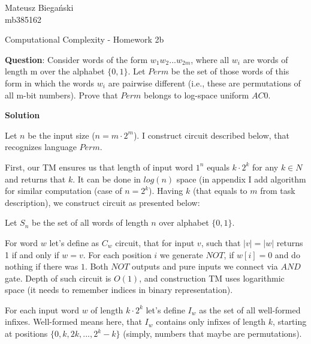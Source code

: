 \documentclass[12pt]{article}
\begin{document}

\begin{flushright}
    Mateusz Biegański \\ 
    mb385162
\end{flushright}

\begin{center}
    \Large Computational Complexity - Homework 2b \normalsize
\end{center}

\textbf{Question}:
Consider words of the form $w_1w_2 ...w_{2m}$, where all $w_i$ are words of
length m over the alphabet $\{0, 1\}$. Let $Perm$ be the set of those words of this form in which the
words $w_i$ are pairwise different (i.e., these are permutations of all m-bit numbers). Prove that
$Perm$ belongs to log-space uniform $AC0$.



{\bf Solution}

Let $n$ be the input size ($n = m \cdot 2^m$). I construct circuit described below, that recognizes language $Perm$.

First, our TM ensures us that length of input word $1^n$ equals $k\cdot2^k$ for any $k \in N$ and returns that $k$. It can be done in $log(n)$ space (in appendix I add algorithm for similar computation (case of $n = 2^k$).
Having $k$ (that equals to $m$ from task description), we construct circuit as presented below:

Let $S_n$ be the set of all words of length $n$ over alphabet $\{0,1\}$.

For word $w$ let's define as $C_w$ circuit, that for input $v$, such that $|v| = |w|$ returns 1 if and only if $w = v$. For each position $i$ we generate $NOT$, if $w[i] = 0$ and do nothing if there was $1$. Both $NOT$ outputs and pure inputs we connect via $AND$ gate.
Depth of such circuit is $O(1)$, and construction TM uses logarithmic space (it needs to remember indices in binary representation).


For each input word $w$ of length $k\cdot2^k$ let's define $I_{w}$ as the set of all well-formed infixes. Well-formed means here, that $I_w$ contains only infixes of length $k$, starting at positions $\{0, k, 2k, ... , 2^k - k\}$ (simply, numbers that maybe are permutations).
\\
\end{document}
